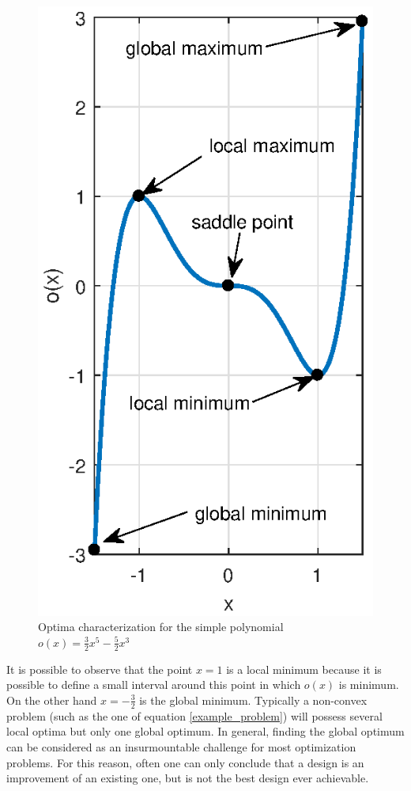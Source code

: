 \begin{figure}[ht]
\centering
\includegraphics[width=12cm]{images/Ch2/example_minimum_maximum}
\caption{Optima characterization for the simple polynomial $o(x)=\frac{3}{2}x^5-\frac{5}{2}x^3$}
\label{fig.2.4b}
\end{figure}
It is possible to observe that the point $x=1$ is a local minimum because it is possible to define a small interval around this point in which $o(x)$ is minimum. On the other hand $x=-\frac{3}{2}$ is the global minimum.
 Typically a non-convex problem (such as the one of equation \eqref{example_problem}) will possess several local optima but only one global optimum. In general, finding the global optimum can be considered as an insurmountable challenge for most optimization problems. For this reason, often one can only conclude that a design is an improvement of an existing one, but is not the best design ever achievable. 
